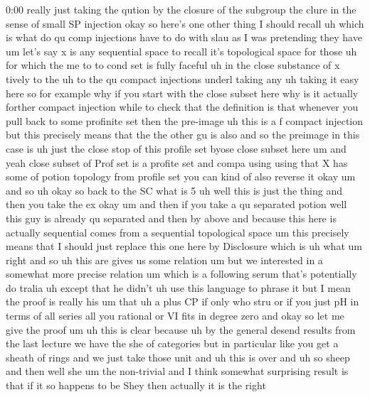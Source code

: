 \begin{unfinished}{0:00}
really  just  taking  the  qution  by  the
closure  of  the
subgroup  the  clure  in  the  sense  of  small
SP  injection  okay  so  here's  one  other
thing  I  should  recall
uh  which  is  what  do  qu  comp  injections
have  to  do  with  slau  as  I  was  pretending
they  have  um  let's  say  x  is  any
sequential
space  to  recall  it's  topological  space
for  those  uh  for  which  the  me
to  to  cond  set  is  fully
faceful  uh  in  the  close  substance  of
x  tively  to
the  uh  to  the  qu  compact
injections  underl  taking
any
uh  taking  it  easy
here
so  for  example  why  if  you  start  with  the
close  subset  here  why  is  it  actually
forther  compact  injection  while  to  check
that  the  definition  is  that  whenever  you
pull  back  to  some  profinite  set  then  the
pre-image  uh  this  is  a  f  compact
injection  but  this  precisely  means  that
the  the  other  gu  is
also  and  so  the  preimage  in  this  case  is
uh  just  the  close  stop  of  this  profile
set  byose  close  subset  here
um
and  yeah  close  subset  of  Prof  set  is  a
profite  set  and
compa  using  using  that  X  has  some  of
potion  topology  from  profile  set  you  can
kind  of  also  reverse
it
okay
um  and
so  uh  okay  so  back  to  the
SC  what  is
5  uh  well  this  is
just  the  thing  and  then  you  take  the
ex
okay
um  and
then  if  you  take  a  qu  separated  potion
well  this  guy  is  already  qu  separated
and  then  by  above  and  because  this  here
is  actually  sequential  comes  from  a
sequential  topological  space  um  this
precisely  means  that  I  should  just
replace  this  one  here  by
Disclosure
which  is  uh
what
um  right  and  so  uh  this  are  gives  us
some  relation  um  but  we  interested  in  a
somewhat  more  precise  relation  um  which
is  a  following
serum  that's  potentially  do
tralia  uh  except  that  he  didn't  uh  use
this  language  to  phrase  it  but  I  mean
the  proof  is  really  his  um  that
uh  a  plus
CP  if
only  who
stru  or  if  you  just  pH  in  terms  of  all
series  all  you
rational  or  VI  fits  in  degree
zero
and  okay  so  let  me  give  the
proof
um  uh  this  is  clear
because  uh  by  the  general  desend  results
from  the  last  lecture  we  have  the  she  of
categories  but  in  particular  like  you
get  a  sheath  of  rings  and  we  just  take
those  unit  and  uh  this  is
over  and  uh  so  sheep  and  then  well  she
um  the  non-trivial  and  I  think  somewhat
surprising  result  is  that  if  it  so
happens  to  be  Shey  then  actually  it  is
the  right

\end{unfinished}

